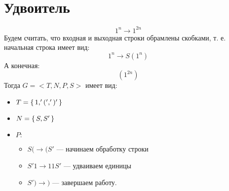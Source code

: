 \section{Удвоитель}
\[
    1^{n} \rightarrow 1^{2n}
\]
Будем считать, что входная и выходная строки обрамлены скобками, т. е. начальная строка имеет вид:
\[
    1^{n} \rightarrow S(1^{n})
\]
А конечная:
\[
    (1^{2n})
\]
Тогда $G = <T, N, P, S>$ имеет вид:
\begin{itemize}
    \item $T = \set{1, '(', ')'}$
    \item $N = \set{S, S'}$
    \item $P\colon$
        \begin{itemize}
            \item $S( \rightarrow (S'$ --- начинаем обработку строки
            \item $S'1 \rightarrow 11S'$ --- удваиваем единицы
            \item $S') \rightarrow )$ --- завершаем работу.
        \end{itemize}
\end{itemize}
